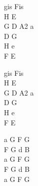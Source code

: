\begin{chord}
    gis Fis\\
    H E\\
    G D A2 a\\
    D G\\
    H e\\
    F E

    gis Fis\\
    H E\\
    G D A2 a\\
    D G\\
    H e\\
    F E

    a G F G\\
    F G d B\\
    a G F G\\
    F G d B\\
    a G F G
\end{chord}